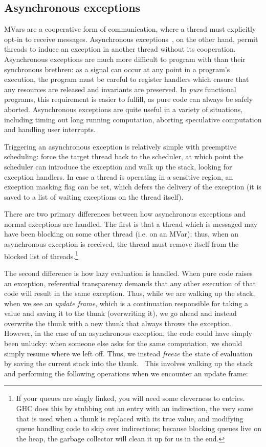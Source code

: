 \subsection{Asynchronous exceptions}

MVars are a cooperative form of communication, where a thread must
explicitly opt-in to receive messages.  Asynchronous
exceptions~\cite{Marlow:2001:AEH:378795.378858}, on the other hand,
permit threads to induce an exception in another thread without its
cooperation.  Asynchronous exceptions are much more difficult to program
with than their synchronous brethren: as a signal can occur at any point
in a program's execution, the program must be careful to register
handlers which ensure that any resources are released and invariants are
preserved.  In \emph{pure} functional programs, this requirement is
easier to fulfill, as pure code can always be safely aborted.
Asynchronous exceptions are quite useful in a variety of situations,
including timing out long running computation, aborting speculative
computation and handling user interrupts.

Triggering an asynchronous exception is relatively simple with
preemptive scheduling: force the target thread back to the scheduler,
at which point the scheduler can introduce the exception and walk up the
stack, looking for exception handlers.  In
case a thread is operating in a sensitive region, an exception masking
flag can be set, which defers the delivery of the exception (it is saved
to a list of waiting exceptions on the thread itself).

There are two primary differences between how asynchronous exceptions
and normal exceptions are handled.  The first is that a thread which is
messaged may have been blocking on some other thread (i.e. on an MVar);
thus, when an asynchronous exception is received, the thread must remove
itself from the blocked list of threads.\footnote{If your queues are
    singly linked, you will need some cleverness to entries. GHC does
    this by stubbing out an entry with an indirection, the very same
that is used when a thunk is replaced with its true value, and modifying
queue handling code to skip over indirections; because blocking queues
live on the heap, the garbage collector will clean it up for us in the end.}


The second difference is how lazy evaluation is handled. When pure code
raises an exception, referential transparency demands that any other
execution of that code will result in the same exception.  Thus, while
we are walking up the stack, when we see an \emph{update frame}, which
is a continuation responsible for taking a value and saving it to the
thunk (overwriting it), we go ahead and instead overwrite the thunk with a new
thunk that always throws the exception.  However, in the case of an
asynchronous exception, the code could have simply been unlucky: when
someone else asks for the same computation, we should simply resume
where we left off.  Thus, we instead \emph{freeze} the state of
evaluation by saving the current stack into the thunk.~\cite{Reid1999}
This involves walking up the stack and performing the following
operations when we encounter an update frame:

